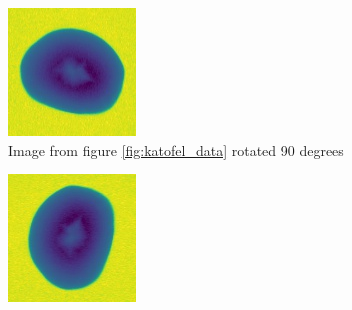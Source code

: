 \documentclass[11pt]{article}
\begin{document}
\begin{figure}[!h]
     \centering
     \begin{subfigure}[b]{0.3\textwidth}
         \centering
         \includegraphics[width=\textwidth]{figurer/hollow_15_90.jpg}
         \caption{Image from figure \ref{fig:katofel_data} rotated 90 degrees}
         \label{fig:rcnn_result1}
     \end{subfigure}
     \hfill
     \begin{subfigure}[b]{0.3\textwidth}
         \centering
         \includegraphics[width=\textwidth]{figurer/hollow_15_180.jpg}

\end{subfigure}
\end{figure}
\end{document}
